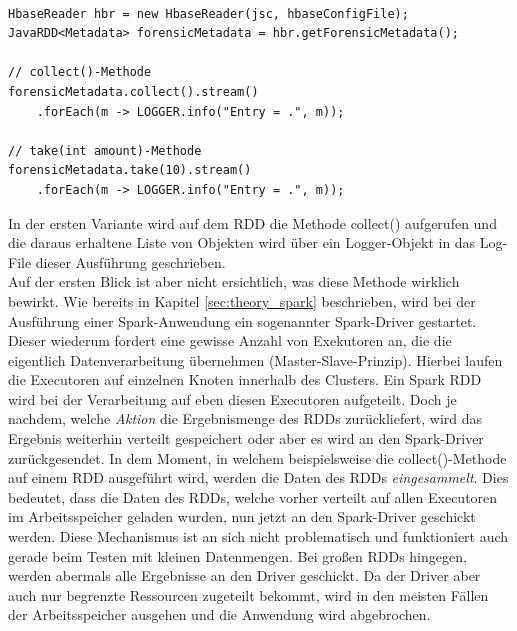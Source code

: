\begin{lstlisting}[label={lst:spark_rdd_collect},caption= Anzeige der Ergebnisse eines Spark RDDs ,captionpos=b,frame=single,style=customjava]

HbaseReader hbr = new HbaseReader(jsc, hbaseConfigFile);
JavaRDD<Metadata> forensicMetadata = hbr.getForensicMetadata();

// collect()-Methode
forensicMetadata.collect().stream()
	.forEach(m -> LOGGER.info("Entry = .", m));

// take(int amount)-Methode	
forensicMetadata.take(10).stream()
	.forEach(m -> LOGGER.info("Entry = .", m));	
\end{lstlisting}

\noindent
In der ersten Variante wird auf dem RDD die Methode collect() aufgerufen und die daraus erhaltene Liste von Objekten wird über ein Logger-Objekt in das Log-File dieser Ausführung geschrieben.\\
Auf der ersten Blick ist aber nicht ersichtlich, was diese Methode wirklich bewirkt. Wie bereits in Kapitel \ref{sec:theory_spark} beschrieben, wird bei der Ausführung einer Spark-Anwendung ein sogenannter Spark-Driver gestartet. Dieser wiederum fordert eine gewisse Anzahl von Exekutoren an, die die eigentlich Datenverarbeitung übernehmen (Master-Slave-Prinzip). Hierbei laufen die Executoren auf einzelnen Knoten innerhalb des Clusters. Ein Spark RDD wird bei der Verarbeitung auf eben diesen Executoren aufgeteilt. Doch je nachdem, welche \textit{Aktion} die Ergebnismenge des RDDs zurückliefert, wird das Ergebnis weiterhin verteilt gespeichert oder aber es wird an den Spark-Driver zurückgesendet. In dem Moment, in welchem beispielsweise die collect()-Methode auf einem RDD ausgeführt wird, werden die Daten des RDDs \textit{eingesammelt}. Dies bedeutet, dass die Daten des RDDs, welche vorher verteilt auf allen Executoren im Arbeitsspeicher geladen wurden, nun jetzt an den Spark-Driver geschickt werden. Diese Mechanismus ist an sich nicht problematisch und funktioniert auch gerade beim Testen mit kleinen Datenmengen. Bei großen RDDs hingegen, werden abermals alle Ergebnisse an den Driver geschickt. Da der Driver aber auch nur begrenzte Ressourcen zugeteilt bekommt, wird in den meisten Fällen der Arbeitsspeicher ausgehen und die Anwendung wird abgebrochen.\\

